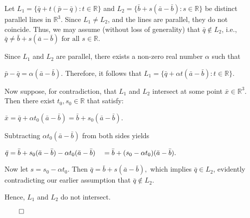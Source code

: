 \begin{proofbox}
Let \( L_1 = \{ \bar{q} + t(\bar{p} - \bar{q}) : t \in \mathbb{R} \} \) and  
\( L_2 = \{ \bar{b} + s(\bar{a} - \bar{b}) : s \in \mathbb{R} \} \) be distinct parallel lines in \( \mathbb{R}^3 \). Since \( L_1 \neq L_2 \), and the lines are parallel, they do not coincide.  
Thus, we may assume (without loss of generality) that \( \bar{q} \notin L_2 \), i.e., $\bar{q} \neq \bar{b} + s(\bar{a} - \bar{b}) \text{ for all } s \in \mathbb{R}.$

\vspace{0.5em}

Since \( L_1 \) and \( L_2 \) are parallel, there exists a non-zero real number \( \alpha \) such that 

$\bar{p} - \bar{q} = \alpha(\bar{a} - \bar{b}).$
Therefore, it follows that $L_1 = \{ \bar{q} + \alpha t(\bar{a} - \bar{b}) : t \in \mathbb{R} \}$.

\vspace{0.5em}

Now suppose, for contradiction, that \( L_1 \) and \( L_2 \) intersect at some point \( \bar{x} \in \mathbb{R}^3 \).  
Then there exist \( t_0, s_0 \in \mathbb{R} \) that satisfy: 

$\bar{x} = \bar{q} + \alpha t_0 (\bar{a} - \bar{b}) = \bar{b} + s_0 (\bar{a} - \bar{b})$.

Subtracting \( \alpha t_0 (\bar{a} - \bar{b}) \) from both sides yields

\(\bar{q} = \bar{b} + s_0 (\bar{a} - \bar{b}) - \alpha t_0 (\bar{a} - \bar{b}) \\
\quad = \bar{b} + (s_0 - \alpha t_0)(\bar{a} - \bar{b}).
\)

\vspace{0.5em}
Now let \( s = s_0 - \alpha t_0 \). Then
\(
\bar{q} = \bar{b} + s(\bar{a} - \bar{b}),
\)
which implies \( \bar{q} \in L_2 \), evidently contradicting our earlier assumption that \( \bar{q} \notin L_2 \).
 
Hence, \( L_1 \) and \( L_2 \) do not intersect.

\hfill $\qed$
\end{proofbox}

